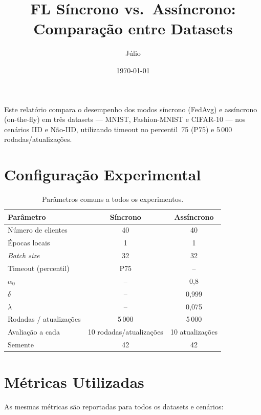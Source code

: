 \documentclass[12pt, a4paper]{article}
\title{\large\textbf{FL Síncrono vs.\ Assíncrono: Comparação entre Datasets}}
\author{Júlio}
\date{\today}
\begin{document}
\maketitle

Este relatório compara o desempenho dos modos síncrono (FedAvg) e assíncrono
(on-the-fly) em três datasets --- MNIST, Fashion-MNIST e CIFAR-10 --- nos cenários
IID e Não-IID, utilizando timeout no percentil~75 (P75) e 5\,000 rodadas/atualizações.

\section{Configuração Experimental}

\begin{table}[H]
\centering
\caption{Parâmetros comuns a todos os experimentos.}
\label{tab:params}
\renewcommand{\arraystretch}{1.25}
\begin{tabular}{lcc}
\toprule
\textbf{Parâmetro} & \textbf{Síncrono} & \textbf{Assíncrono} \\
\midrule
Número de clientes     & 40  & 40  \\
Épocas locais          & 1   & 1   \\
\textit{Batch size}    & 32  & 32  \\
Timeout (percentil)    & P75 & --  \\
$\alpha_0$             & --  & 0{,}8  \\
$\delta$               & --  & 0{,}999 \\
$\lambda$              & --  & 0{,}075 \\
Rodadas / atualizações & 5\,000 & 5\,000 \\
Avaliação a cada       & 10 rodadas/atualizações & 10 atualizações \\
Semente                & 42  & 42  \\
\bottomrule
\end{tabular}
\end{table}

\section{Métricas Utilizadas}

As mesmas métricas são reportadas para todos os datasets e cenários:
\end{document}

